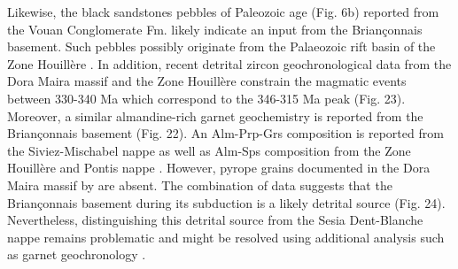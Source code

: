 \documentclass[twoside]{article}
\begin{document}
Likewise, the black sandstones pebbles of Paleozoic age (Fig. 6b) reported from the Vouan Conglomerate Fm. likely indicate an input from the Briançonnais basement. Such pebbles possibly originate from the Palaeozoic rift basin of the Zone Houillère \citep{Fabre1961}. In addition, recent detrital zircon geochronological data from the Dora Maira massif and the Zone Houillère \citep{Manzotti2016} constrain the magmatic events between 330-340 Ma which correspond to the 346-315 Ma peak (Fig. 23). Moreover, a similar almandine-rich garnet geochemistry is reported from the Briançonnais basement (Fig. 22). An Alm-Prp-Grs composition is reported from the Siviez-Mischabel nappe \citep{Thelin1990} as well as Alm-Sps composition from the Zone Houillère \citep{Bucher2007} and Pontis nappe \citep{Giorgis1999}. However, pyrope grains documented in the Dora Maira massif by \citep{Schertl1991} are absent. The combination of data suggests that the Briançonnais basement during its subduction is a likely detrital source (Fig. 24). Nevertheless, distinguishing this detrital source from the Sesia Dent-Blanche nappe remains problematic and might be resolved using additional analysis such as garnet geochronology \citep{Baxter2013}.\par
\medskip

\end{document}
